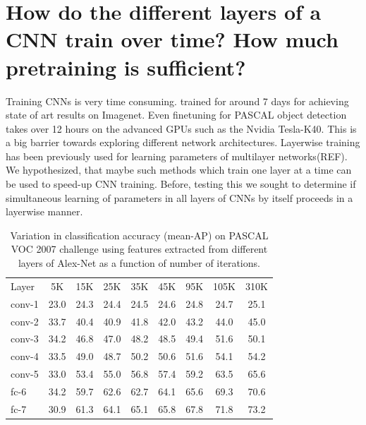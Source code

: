 \section{How do the different layers of a CNN train over time? How much pretraining is sufficient?}
\label{sec:speed}
Training CNNs is very time consuming. \cite{Kriz} trained for around 7 days for achieving state of art results on Imagenet. Even finetuning for PASCAL object detection \cite{Rcnn} takes over 12 hours on the advanced GPUs such as the Nvidia Tesla-K40. This is a big barrier towards exploring different network architectures. Layerwise training has been previously used for learning parameters of multilayer networks(REF). We hypothesized, that maybe such methods which train one layer at a time can be used to speed-up CNN training. Before, testing this we sought to determine if simultaneous learning of parameters in all layers of CNNs by itself proceeds in a layerwise manner. 


\setlength{\tabcolsep}{4pt}
\begin{table}[t!]
\begin{center}
\caption{Variation in classification accuracy (mean-AP) on PASCAL VOC 2007 challenge using features extracted from different layers of Alex-Net as a function of number of iterations.}
\label{table:det-traj-classify}
\begin{tabular}{lcccccccc}
\hline\noalign{\smallskip}
Layer  & 5K & 15K & 25K & 35K & 45K & 95K & 105K & 310K \\
\noalign{\smallskip}
\hline
\noalign{\smallskip}
conv-1 & 23.0 & 24.3 & 24.4 & 24.5 & 24.6 & 24.8 & 24.7 & 25.1\\
conv-2 & 33.7 & 40.4 & 40.9 & 41.8 & 42.0 & 43.2 & 44.0 & 45.0\\
conv-3 & 34.2 & 46.8 & 47.0 & 48.2 & 48.5 & 49.4 & 51.6 & 50.1\\
conv-4 & 33.5 & 49.0 & 48.7 & 50.2 & 50.6 & 51.6 & 54.1 & 54.2\\
conv-5 & 33.0 & 53.4 & 55.0 & 56.8 & 57.4 & 59.2 & 63.5 & 65.6\\
fc-6 & 34.2 & 59.7 & 62.6 & 62.7 & 64.1 & 65.6 & 69.3 & 70.6\\
fc-7 & 30.9 & 61.3 & 64.1 & 65.1 & 65.8 & 67.8 & 71.8 & 73.2\\
\hline
\end{tabular}
\end{center}
\end{table}
\setlength{\tabcolsep}{1.4pt}

